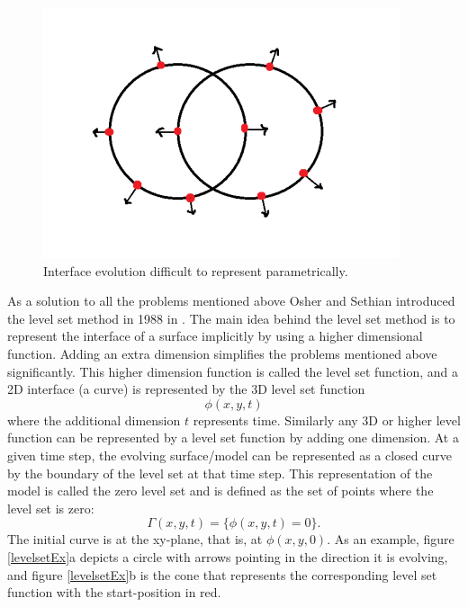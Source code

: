 \begin{figure}[h!]
\centering
\includegraphics[width=.5\textwidth]{backgroundTheory/levelset/twoCircles}
\caption{Interface evolution difficult to represent parametrically.}
\label{problematicEvo}
\end{figure}

As a solution to all the problems mentioned above Osher and Sethian introduced the level set method in 1988 in \cite{osher88}. The main idea behind the level set method is to represent the interface of a surface implicitly by using a higher dimensional function. Adding an extra dimension simplifies the problems mentioned above significantly. This higher dimension function is called the level set function, and a 2D interface (a curve) is represented by the 3D level set function
\begin{equation}
\phi(x, y, t) 
\end{equation}
where the additional dimension \(t\) represents time. Similarly any 3D or higher level function can be represented by a level set function by adding one dimension. At a given time step, the evolving surface/model can be represented as a closed curve by the boundary of the level set at that time step. This representation of the model is called the zero level set and is defined as the set of points where the level set is zero:
\begin{equation}
\Gamma(x, y, t) = \{\phi(x, y, t) = 0\}. 
\end{equation}
The initial curve is at the xy-plane, that is, at \(\phi(x,y,0)\). As an example, figure \ref{levelsetEx}a depicts a circle with arrows pointing in the direction it is evolving, and figure \ref{levelsetEx}b is the cone that represents the corresponding level set function with the start-position in red.


